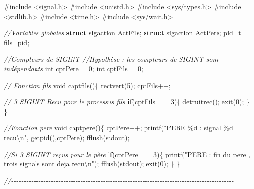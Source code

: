 \documentclass[
]{article}
\newenvironment{Shaded}{}{}
\newcommand{\CommentTok}[1]{\textcolor[rgb]{0.38,0.63,0.69}{\textit{#1}}}
\newcommand{\ControlFlowTok}[1]{\textcolor[rgb]{0.00,0.44,0.13}{\textbf{#1}}}
\newcommand{\DataTypeTok}[1]{\textcolor[rgb]{0.56,0.13,0.00}{#1}}
\newcommand{\DecValTok}[1]{\textcolor[rgb]{0.25,0.63,0.44}{#1}}
\newcommand{\ImportTok}[1]{#1}
\newcommand{\KeywordTok}[1]{\textcolor[rgb]{0.00,0.44,0.13}{\textbf{#1}}}
\newcommand{\NormalTok}[1]{#1}
\newcommand{\PreprocessorTok}[1]{\textcolor[rgb]{0.74,0.48,0.00}{#1}}
\newcommand{\SpecialCharTok}[1]{\textcolor[rgb]{0.25,0.44,0.63}{#1}}
\newcommand{\StringTok}[1]{\textcolor[rgb]{0.25,0.44,0.63}{#1}}
\begin{document}
\begin{Shaded}
\begin{Highlighting}[]
\PreprocessorTok{\#include }\ImportTok{\textless{}signal.h\textgreater{}}
\PreprocessorTok{\#include }\ImportTok{\textless{}unistd.h\textgreater{}}
\PreprocessorTok{\#include }\ImportTok{\textless{}sys/types.h\textgreater{}}
\PreprocessorTok{\#include }\ImportTok{\textless{}stdlib.h\textgreater{}}
\PreprocessorTok{\#include }\ImportTok{\textless{}time.h\textgreater{}}
\PreprocessorTok{\#include }\ImportTok{\textless{}sys/wait.h\textgreater{}}


\CommentTok{//Variables globales}
\KeywordTok{struct}\NormalTok{ sigaction ActFils;}
\KeywordTok{struct}\NormalTok{ sigaction ActPere;}
\NormalTok{pid\_t fils\_pid;}

\CommentTok{//Compteurs de SIGINT}
\CommentTok{//Hypothèse : les compteurs de SIGINT sont indépendants }
\DataTypeTok{int}\NormalTok{ cptPere = }\DecValTok{0}\NormalTok{;}
\DataTypeTok{int}\NormalTok{ cptFils = }\DecValTok{0}\NormalTok{;}


\CommentTok{// Fonction fils}
\DataTypeTok{void}\NormalTok{ captfils()\{}
\NormalTok{    rectvert(}\DecValTok{5}\NormalTok{);}
\NormalTok{    cptFils++;}
    
    \CommentTok{// 3 SIGINT Recu pour le processus fils}
    \ControlFlowTok{if}\NormalTok{(cptFils == }\DecValTok{3}\NormalTok{)\{}
\NormalTok{        detruitrec();}
\NormalTok{        exit(}\DecValTok{0}\NormalTok{);}
\NormalTok{    \}}
\NormalTok{\}}


\CommentTok{//Fonction pere}
\DataTypeTok{void}\NormalTok{ captpere()\{}
\NormalTok{    cptPere++;}
\NormalTok{    printf(}\StringTok{"PERE \%d : signal \%d recu}\SpecialCharTok{\textbackslash{}n}\StringTok{"}\NormalTok{, getpid(),cptPere);}
\NormalTok{    fflush(stdout);}
    
    \CommentTok{//Si 3 SIGINT reçus pour le père}
    \ControlFlowTok{if}\NormalTok{(cptPere == }\DecValTok{3}\NormalTok{)\{}
\NormalTok{        printf(}\StringTok{"PERE : fin du pere , trois signals sont deja recu}\SpecialCharTok{\textbackslash{}n}\StringTok{"}\NormalTok{);}
\NormalTok{        fflush(stdout);}
\NormalTok{        exit(}\DecValTok{0}\NormalTok{);}
\NormalTok{    \}}
\NormalTok{\}}


\CommentTok{//{-}{-}{-}{-}{-}{-}{-}{-}{-}{-}{-}{-}{-}{-}{-}{-}{-}{-}{-}{-}{-}{-}{-}{-}{-}{-}{-}{-}{-}{-}{-}{-}{-}{-}{-}{-}{-}{-}{-}{-}{-}{-}{-}{-}{-}{-}{-}{-}{-}{-}{-}{-}{-}{-}{-}{-}{-}{-}{-}{-}{-}{-}{-}{-}{-}{-}{-}{-}{-}{-}{-}{-}{-}{-}{-}{-}{-}{-}{-}{-}{-}{-}{-}{-}{-}{-}{-}{-}{-}{-}}


\end{Highlighting}
\end{Shaded}
\end{document}
